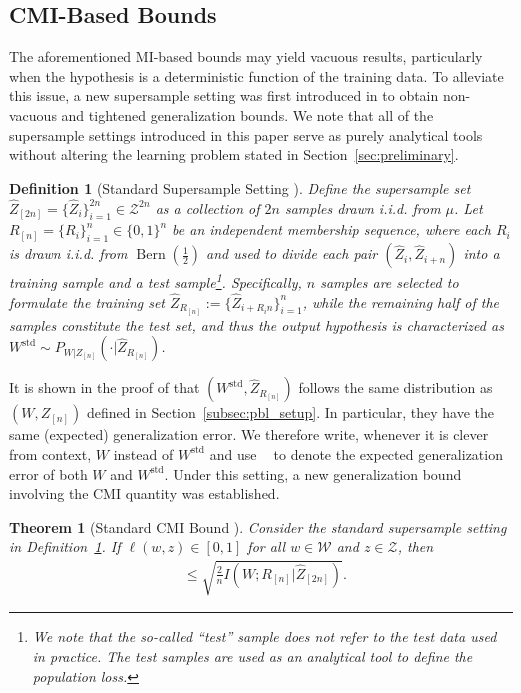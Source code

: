 \documentclass[onecolumn,romanappendices,10pt]{IEEEtran}
\newtheorem{theorem}{Theorem}
\newtheorem{definition}{Definition}
\newcommand{\Wcal}{{\mathcal W}}
\newcommand{\Zcal}{{\mathcal Z}}
\DeclareMathOperator{\gen}{\overline{gen}}
\DeclareMathOperator{\Bernoulli}{Bern}
\begin{document}
	\subsection{CMI-Based Bounds}
	The aforementioned MI-based bounds may yield vacuous results, particularly when the hypothesis is a deterministic function of the training data. To alleviate this issue, a new supersample setting was first introduced in \cite{steinke2020reasoning} to obtain non-vacuous and tightened generalization bounds. We note that all of the supersample settings introduced in this paper serve as purely analytical tools without altering the learning problem stated in Section~\ref{sec:preliminary}.
	\begin{definition}[Standard Supersample Setting \cite{steinke2020reasoning}] \label{def:standard-supersample}
		Define the supersample set $\hat{Z}_{[2n]} = \{\hat{Z}_i\}_{i=1}^{2n} \in \Zcal^{2n}$ as a collection of $2n$ samples drawn i.i.d. from $\mu$. Let $R_{[n]} = \{R_i\}_{i=1}^{n} \in \{0,1\}^n$ be an independent membership sequence, where each $R_i$ is drawn i.i.d. from $\Bernoulli(\frac{1}{2})$ and used to divide each pair $(\hat{Z}_{i}, \hat{Z}_{i+n})$ into a training sample and a test sample\footnote{We note that the so-called ``test'' sample does not refer to the test data used in practice. The test samples are used as an analytical tool to define the population loss.}. Specifically, $n$ samples are selected to formulate the training set $\hat{Z}_{R_{[n]}} := \{\hat{Z}_{i + R_i n}\}_{i=1}^{n}$, while the remaining half of the samples constitute the test set, and thus the output hypothesis is characterized as $W^{\textrm{std}} \sim P_{W|Z_{[n]}}(\cdot | \hat{Z}_{R_{[n]}})$.
	\end{definition}
	It is shown in the proof of \cite[Theorem 5.1]{steinke2020reasoning} that $(W^{\textrm{std}}, \hat{Z}_{R_{[n]}})$ follows the same distribution as $(W,Z_{[n]})$ defined in Section~\ref{subsec:pbl_setup}. In particular, they have the same (expected) generalization error. We therefore write, whenever it is clever from context, $W$ instead of $W^{\textrm{std}}$ and use $\gen$ to denote the expected generalization error of both $W$ and $W^{\textrm{std}}$. Under this setting, a new generalization bound involving the CMI quantity was established.
	\begin{theorem}[Standard CMI Bound \cite{steinke2020reasoning}] \label{thm:CMI}
		Consider the standard supersample setting in Definition~\ref{def:standard-supersample}. If $\ell(w, z) \in [0, 1]$ for all $w \in \Wcal$ and $z \in \Zcal$, then
		\begin{equation}
			\begin{aligned}
				\gen \leq \sqrt{\frac{2}{n} I\left( W; R_{[n]} | \hat{Z}_{[2n]} \right)}.
			\end{aligned}
			\label{eq:CMI}
		\end{equation}
	\end{theorem}
\end{document}
